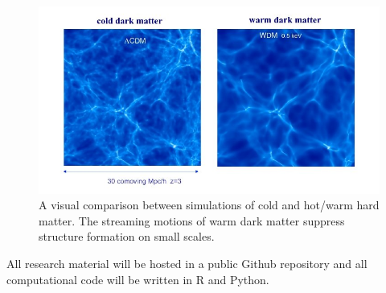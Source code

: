 \documentclass[12pt]{article}
\begin{document}
\begin{figure}[!htb]
	\centering
    \includegraphics[width=0.5\linewidth]{simulations.jpg}
    \caption{A visual comparison between simulations of cold and hot/warm hard matter. The streaming motions of warm dark matter suppress structure formation on small scales.}
\end{figure}

All research material will be hosted in a public Github repository and all computational code will be written in R and Python. 
\end{document}
